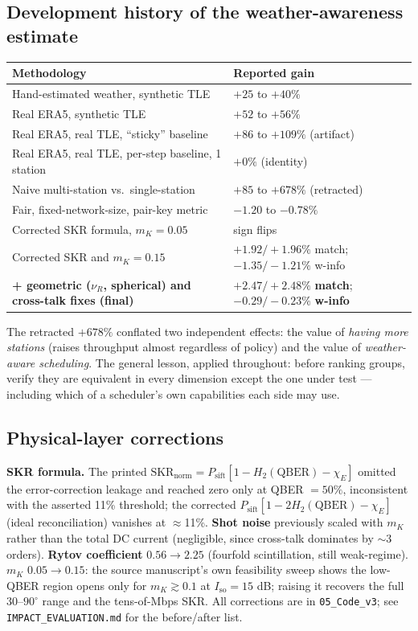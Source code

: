 \subsection{Development history of the weather-awareness estimate}
\begin{center}\small\renewcommand{\arraystretch}{1.2}
\begin{tabular}{@{}p{}p{}@{}}\toprule
Methodology & Reported gain \\ \midrule
Hand-estimated weather, synthetic TLE & $+25$ to $+40\%$ \\
Real ERA5, synthetic TLE & $+52$ to $+56\%$ \\
Real ERA5, real TLE, ``sticky'' baseline & $+86$ to $+109\%$ (artifact) \\
Real ERA5, real TLE, per-step baseline, 1 station & $+0\%$ (identity) \\
Naive multi-station vs.\ single-station & $+85$ to $+678\%$ (retracted) \\
Fair, fixed-network-size, pair-key metric & $-1.20$ to $-0.78\%$ \\
Corrected SKR formula, $m_K=0.05$ & sign flips \\
Corrected SKR and $m_K=0.15$ & $+1.92/+1.96\%$ match; $-1.35/-1.21\%$ w-info \\
\textbf{+ geometric ($\nu_R$, spherical) and cross-talk fixes (final)} & $\mathbf{+2.47/+2.48\%}$ \textbf{match}; $\mathbf{-0.29/-0.23\%}$ \textbf{w-info} \\ \bottomrule
\end{tabular}\end{center}
The retracted $+678\%$ conflated two independent effects: the value of \emph{having more stations} (raises throughput almost regardless of policy) and the value of \emph{weather-aware scheduling}. The general lesson, applied throughout: before ranking groups, verify they are equivalent in every dimension except the one under test --- including which of a scheduler's own capabilities each side may use.

\subsection{Physical-layer corrections}
\textbf{SKR formula.} The printed $\text{SKR}_\text{norm}=P_\text{sift}[1-H_2(\text{QBER})-\chi_E]$ omitted the error-correction leakage and reached zero only at QBER $=50\%$, inconsistent with the asserted 11\% threshold; the corrected $P_\text{sift}[1-2H_2(\text{QBER})-\chi_E]$ (ideal reconciliation) vanishes at $\approx$11\%. \textbf{Shot noise} previously scaled with $m_K$ rather than the total DC current (negligible, since cross-talk dominates by $\sim$3 orders). \textbf{Rytov coefficient} $0.56\to2.25$ (fourfold scintillation, still weak-regime). \textbf{$m_K$} $0.05\to0.15$: the source manuscript's own feasibility sweep shows the low-QBER region opens only for $m_K\gtrsim0.1$ at $I_\text{so}=15$ dB; raising it recovers the full $30$--$90^\circ$ range and the tens-of-Mbps SKR. All corrections are in \texttt{05\_Code\_v3}; see \texttt{IMPACT\_EVALUATION.md} for the before/after list.

